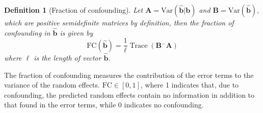 \documentclass[12pt]{article} %
\newtheorem{definition}{Definition}
\newcommand{\ginv}{\ensuremath{^{-}}}
\newcommand{\trans}{\ensuremath{^\prime}}
\newcommand{\var}{\ensuremath{\mathrm{Var}}}
\DeclareMathOperator{\tr}{Trace}
\begin{document}

\begin{definition}[Fraction of confounding]
Let $\bm{A} = \var(\widehat{\bm{b}} | \bm{b} )$ and $\bm{B} = \var(\widehat{\bm{b}})$, which are positive semidefinite matrices by definition, then the fraction of confounding in $\widehat{\bm{b}}$ is given by
%
\begin{equation}\label{eq:fc2}
\text{FC}(\widehat{\bm{b}}) = \frac{1}{\ell} \tr\left( \bm{B}\ginv\bm{A} \right)
\end{equation}
where $\ell$ is the length of vector $\widehat{\bm{b}}$.
\end{definition}
The fraction of confounding measures the contribution of the error terms  to the variance of the random effects. $\text{FC} \in [0,1]$, where 1 indicates that, due to confounding, the predicted random effects contain no information in addition to that found in the error terms, while 0 indicates no confounding. 
\end{document}

